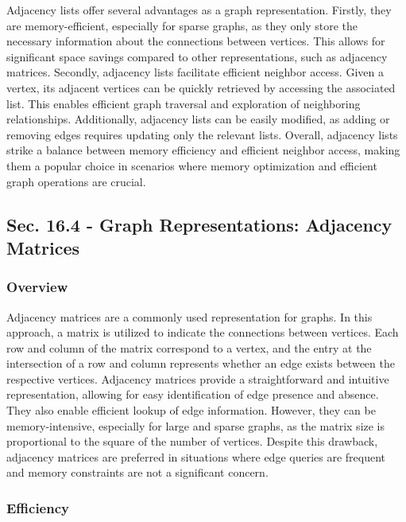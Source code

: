 Adjacency lists offer several advantages as a graph representation. Firstly, they are memory-efficient, especially for sparse graphs, as they only store the necessary information about the connections between 
vertices. This allows for significant space savings compared to other representations, such as adjacency matrices. Secondly, adjacency lists facilitate efficient neighbor access. Given a vertex, its adjacent 
vertices can be quickly retrieved by accessing the associated list. This enables efficient graph traversal and exploration of neighboring relationships. Additionally, adjacency lists can be easily modified, 
as adding or removing edges requires updating only the relevant lists. Overall, adjacency lists strike a balance between memory efficiency and efficient neighbor access, making them a popular choice in scenarios 
where memory optimization and efficient graph operations are crucial.

\subsection*{Sec. 16.4 - Graph Representations: Adjacency Matrices}

\subsubsection{Overview}

Adjacency matrices are a commonly used representation for graphs. In this approach, a matrix is utilized to indicate the connections between vertices. Each row and column of the matrix correspond to a vertex, and 
the entry at the intersection of a row and column represents whether an edge exists between the respective vertices. Adjacency matrices provide a straightforward and intuitive representation, allowing for easy 
identification of edge presence and absence. They also enable efficient lookup of edge information. However, they can be memory-intensive, especially for large and sparse graphs, as the matrix size is proportional 
to the square of the number of vertices. Despite this drawback, adjacency matrices are preferred in situations where edge queries are frequent and memory constraints are not a significant concern.

\subsubsection{Efficiency}

